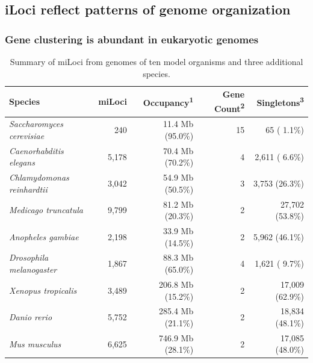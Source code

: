 \subsection{iLoci reflect patterns of genome organization}

\subsubsection{Gene clustering is abundant in eukaryotic genomes}

\begin{table}
\small
\caption{Summary of miLoci from genomes of ten model organisms and three additional species.}
\label{Table:miLocusSummaryModOrg}
\begin{tabularx}{\textwidth}{lrrrr}
\hline
                            Species &               miLoci & Occupancy\textsuperscript{1} & Gene Count\textsuperscript{2} & Singletons\textsuperscript{3}  \\ \hline
\textit{Saccharomyces cerevisiae}   &                  240 &             11.4 Mb (95.0\%) &                            15 &                   65 ( 1.1\%)  \\
\textit{Caenorhabditis elegans}     &                5,178 &             70.4 Mb (70.2\%) &                             4 &                2,611 ( 6.6\%)  \\
\textit{Chlamydomonas reinhardtii}  &                3,042 &             54.9 Mb (50.5\%) &                             3 &                3,753 (26.3\%)  \\
\textit{Medicago truncatula}        &                9,799 &             81.2 Mb (20.3\%) &                             2 &               27,702 (53.8\%)  \\
\textit{Anopheles gambiae}          &                2,198 &             33.9 Mb (14.5\%) &                             2 &                5,962 (46.1\%)  \\
\textit{Drosophila melanogaster}    &                1,867 &             88.3 Mb (65.0\%) &                             4 &                1,621 ( 9.7\%)  \\
\textit{Xenopus tropicalis}         &                3,489 &            206.8 Mb (15.2\%) &                             2 &               17,009 (62.9\%)  \\
\textit{Danio rerio}                &                5,752 &            285.4 Mb (21.1\%) &                             2 &               18,834 (48.1\%)  \\
\textit{Mus musculus}               &                6,625 &            746.9 Mb (28.1\%) &                             2 &               17,085 (48.0\%)  \\

\end{tabularx}
\end{table}
